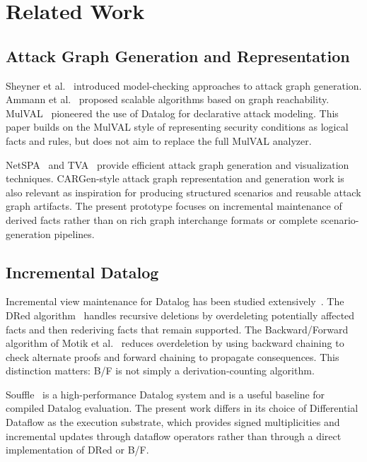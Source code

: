 \documentclass[conference]{IEEEtran}
\begin{document}
\section{Related Work}

\subsection{Attack Graph Generation and Representation}

Sheyner et al.~\cite{sheyner2002automated} introduced model-checking approaches to attack graph generation. Ammann et al.~\cite{ammann2002scalable} proposed scalable algorithms based on graph reachability. MulVAL~\cite{ou2006mulval} pioneered the use of Datalog for declarative attack modeling. This paper builds on the MulVAL style of representing security conditions as logical facts and rules, but does not aim to replace the full MulVAL analyzer.

NetSPA~\cite{ingols2006practical} and TVA~\cite{jajodia2005topological} provide efficient attack graph generation and visualization techniques. CARGen-style attack graph representation and generation work is also relevant as inspiration for producing structured scenarios and reusable attack graph artifacts. The present prototype focuses on incremental maintenance of derived facts rather than on rich graph interchange formats or complete scenario-generation pipelines.

\subsection{Incremental Datalog}

Incremental view maintenance for Datalog has been studied extensively~\cite{gupta1993maintaining}. The DRed algorithm~\cite{staudt1995incremental} handles recursive deletions by overdeleting potentially affected facts and then rederiving facts that remain supported. The Backward/Forward algorithm of Motik et al.~\cite{motik2015incremental} reduces overdeletion by using backward chaining to check alternate proofs and forward chaining to propagate consequences. This distinction matters: B/F is not simply a derivation-counting algorithm.

Souffle~\cite{souffle2016} is a high-performance Datalog system and is a useful baseline for compiled Datalog evaluation. The present work differs in its choice of Differential Dataflow as the execution substrate, which provides signed multiplicities and incremental updates through dataflow operators rather than through a direct implementation of DRed or B/F.
\end{document}
